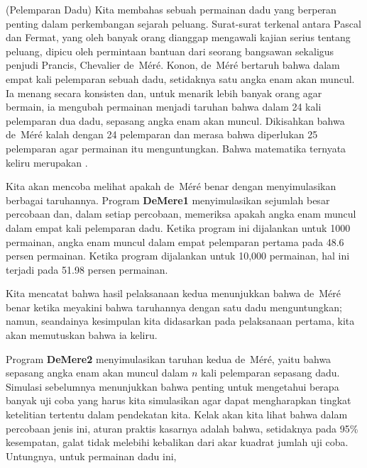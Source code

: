 \begin{example}(Pelemparan Dadu)\label{exam 1.2}
Kita membahas sebuah permainan dadu yang berperan penting dalam
perkembangan sejarah peluang.  Surat-surat terkenal
antara Pascal dan Fermat, 
yang oleh banyak orang dianggap mengawali kajian serius tentang
peluang, dipicu oleh permintaan bantuan dari seorang bangsawan sekaligus
penjudi Prancis, Chevalier de~M\'er\'e.  
Konon, de~M\'er\'e bertaruh
bahwa dalam empat kali pelemparan sebuah dadu, setidaknya satu angka enam akan muncul.  Ia menang
secara konsisten dan, untuk menarik lebih banyak orang agar bermain, ia mengubah permainan menjadi taruhan
bahwa
dalam 24 kali pelemparan dua dadu, sepasang angka enam akan muncul. Dikisahkan bahwa
de~M\'er\'e kalah dengan 24 pelemparan dan merasa bahwa diperlukan 25 pelemparan
agar
permainan itu menguntungkan.  Bahwa matematika ternyata keliru merupakan .
\par
Kita akan mencoba melihat apakah de~M\'er\'e benar dengan menyimulasikan berbagai taruhannya. 
Program {\bf DeMere1} menyimulasikan sejumlah besar percobaan 
dan, dalam setiap percobaan, memeriksa apakah angka enam muncul dalam empat kali pelemparan dadu. Ketika program ini dijalankan untuk
1000 permainan, angka enam muncul dalam empat pelemparan pertama pada 48.6 persen permainan.  Ketika program dijalankan
untuk 10,000 permainan, hal ini terjadi pada 51.98 persen permainan.
\par
Kita mencatat bahwa hasil pelaksanaan kedua menunjukkan bahwa de~M\'er\'e benar
ketika meyakini bahwa taruhannya dengan satu dadu menguntungkan; namun, seandainya
kesimpulan kita didasarkan pada pelaksanaan pertama, kita akan memutuskan bahwa ia keliru. 
\end{example}
\par
Program {\bf DeMere2} menyimulasikan taruhan kedua de~M\'er\'e, yaitu bahwa 
sepasang angka enam akan muncul dalam 
$n$ kali pelemparan sepasang dadu.  Simulasi sebelumnya menunjukkan bahwa penting untuk mengetahui berapa
banyak uji coba yang harus kita simulasikan agar dapat mengharapkan tingkat ketelitian tertentu dalam
pendekatan kita.  Kelak akan kita lihat bahwa dalam percobaan jenis
ini, aturan praktis kasarnya adalah bahwa, setidaknya pada 95\% kesempatan, galat tidak melebihi
kebalikan dari akar kuadrat jumlah uji coba.  Untungnya, untuk permainan dadu ini, 
